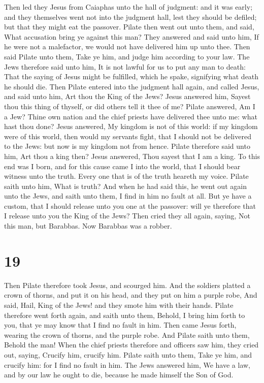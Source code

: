  Then led they Jesus from Caiaphas unto the hall of
judgment: and it was early; and they themselves went not into the
judgment hall, lest they should be defiled; but that they might eat the
passover.  Pilate then went out unto them, and said, What
accusation bring ye against this man?  They answered and
said unto him, If he were not a malefactor, we would not have delivered
him up unto thee.  Then said Pilate unto them, Take ye him,
and judge him according to your law. The Jews therefore said unto him,
It is not lawful for us to put any man to death:  That the
saying of Jesus might be fulfilled, which he spake, signifying what
death he should die.  Then Pilate entered into the judgment
hall again, and called Jesus, and said unto him, Art thou the King of
the Jews?  Jesus answered him, Sayest thou this thing of
thyself, or did others tell it thee of me?  Pilate
answered, Am I a Jew? Thine own nation and the chief priests have
delivered thee unto me: what hast thou done?  Jesus
answered, My kingdom is not of this world: if my kingdom were of this
world, then would my servants fight, that I should not be delivered to
the Jews: but now is my kingdom not from hence.  Pilate
therefore said unto him, Art thou a king then? Jesus answered, Thou
sayest that I am a king. To this end was I born, and for this cause came
I into the world, that I should bear witness unto the truth. Every one
that is of the truth heareth my voice.  Pilate saith unto
him, What is truth? And when he had said this, he went out again unto
the Jews, and saith unto them, I find in him no fault at all.
 But ye have a custom, that I should release unto you one
at the passover: will ye therefore that I release unto you the King of
the Jews?  Then cried they all again, saying, Not this man,
but Barabbas. Now Barabbas was a robber.

\hypertarget{section-18}{%
\section{19}\label{section-18}}

 Then Pilate therefore took Jesus, and scourged him.
 And the soldiers platted a crown of thorns, and put it on
his head, and they put on him a purple robe,  And said,
Hail, King of the Jews! and they smote him with their hands.
 Pilate therefore went forth again, and saith unto them,
Behold, I bring him forth to you, that ye may know that I find no fault
in him.  Then came Jesus forth, wearing the crown of thorns,
and the purple robe. And Pilate saith unto them, Behold the man!
 When the chief priests therefore and officers saw him, they
cried out, saying, Crucify him, crucify him. Pilate saith unto them,
Take ye him, and crucify him: for I find no fault in him. 
The Jews answered him, We have a law, and by our law he ought to die,
because he made himself the Son of God.

